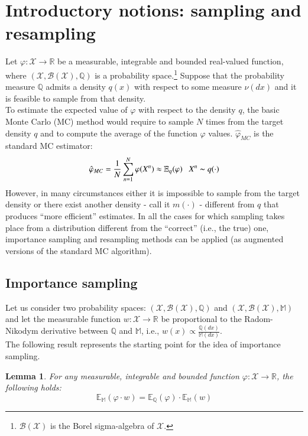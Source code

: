 \documentclass[
]{book}
\theoremstyle{break}
\newtheorem{lemma}{Lemma}
\theoremstyle{nonumberplain}
\begin{document}
\section{Introductory notions: sampling and resampling}\label{pf_intro}

Let \(\varphi: \mathcal X\rightarrow \mathbb R\) be a measurable,
integrable and bounded real-valued function, where
\((\mathcal X,\mathcal B(\mathcal X),\mathbb Q)\) is a probability
space.\footnote{$\mathcal B(\mathcal X)$ is the Borel sigma-algebra of $\mathcal X$.}
Suppose that the probability measure \(\mathbb Q\) admits a density
\(q(x)\) with respect to some measure \(\nu(dx)\) and it is feasible to
sample from that density.\\
To estimate the expected value of \(\varphi\) with respect to the
density \(q\), the basic Monte Carlo (MC) method would require to sample
\(N\) times from the target density \(q\) and to compute the average of
the function \(\varphi\) values. \(\hat \varphi_{MC}\) is the standard
MC estimator: \begin{equation*}
   \hat \varphi_{MC}=\frac{1}{N} \sum_{n=1}^N\varphi (X^n)\approx \mathbb E_q(\varphi)~~~X^n\thicksim q(\cdot)
\end{equation*} However, in many circumstances either it is impossible
to sample from the target density or there exist another density - call
it \(m(\cdot)\) - different from \(q\) that produces ``more efficient''
estimates. In all the cases for which sampling takes place from a
distribution different from the ``correct'' (i.e., the true) one,
importance sampling and resampling methods can be applied (as augmented
versions of the standard MC algorithm).

\subsection{Importance sampling}

Let us consider two probability spaces:
\((\mathcal X,\mathcal B(\mathcal X),\mathbb Q)\) and
\((\mathcal X,\mathcal B(\mathcal X),\mathbb M)\) and let the measurable
function \(w:\mathcal X\rightarrow \mathbb R\) be proportional to the
Radom-Nikodym derivative between \(\mathbb Q\) and \(\mathbb M\), i.e.,
\(w(x)\propto\frac{\mathbb Q(dx)}{\mathbb M(dx)}\).\\
The following result represents the starting point for the idea of
importance sampling.

\begin{lemma}\label{lemma_imp_sam_1}
For any measurable, integrable and bounded function $\varphi: \mathcal X\rightarrow \mathbb R$, the following holds:
\begin{equation}
    \mathbb E_\mathbb M(\varphi \cdot w)=\mathbb E_\mathbb Q(\varphi)\cdot \mathbb E_\mathbb M(w)
\end{equation}
\end{lemma}
\end{document}

